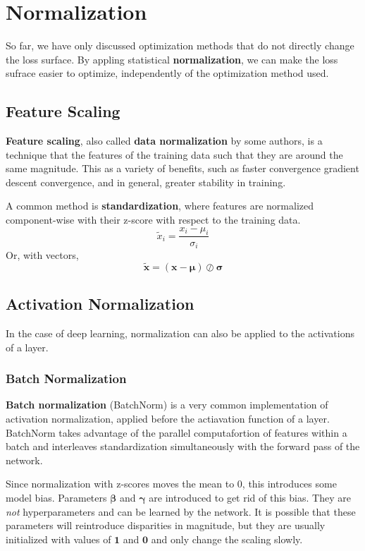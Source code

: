\documentclass[12pt]{report}
\theoremstyle{definition}
\theoremstyle{remark}
\begin{document}
\section{Normalization}
So far, we have only discussed optimization methods that do not directly change the loss surface. By appling statistical \textbf{normalization}, we can make the loss sufrace easier to optimize, independently of the optimization method used.

\subsection{Feature Scaling}
\textbf{Feature scaling}, also called \textbf{data normalization} by some authors, is a technique that the features of the training data such that they are around the same magnitude. This as a variety of benefits, such as faster convergence gradient descent convergence, and in general, greater stability in training.

A common method is \textbf{standardization}, where features are normalized component-wise with their z-score with respect to the training data.
\begin{equation}
    \tilde{x}_i = \frac{x_i - \mu_i}{\sigma_i}
\end{equation}
Or, with vectors,
\begin{equation}
    \tilde{\mathbf{x}} = (\mathbf{x} - \boldsymbol{\mu}) \oslash \boldsymbol{\sigma}
\end{equation}

\subsection{Activation Normalization}
In the case of deep learning, normalization can also be applied to the activations of a layer.

\subsubsection{Batch Normalization}
\textbf{Batch normalization} (BatchNorm) is a very common implementation of activation normalization, applied before the actiavation function of a layer. BatchNorm takes advantage of the parallel computafortion of features within a batch and interleaves standardization simultaneously with the forward pass of the network.

Since normalization with z-scores moves the mean to $0$, this introduces some model bias. Parameters $\boldsymbol{\beta}$ and $\boldsymbol{\gamma}$ are introduced to get rid of this bias. They are \textit{not} hyperparameters and can be learned by the network. It is possible that these parameters will reintroduce disparities in magnitude, but they are usually initialized with values of $\mathbf{1}$ and $\mathbf{0}$ and only change the scaling slowly.
\end{document}
